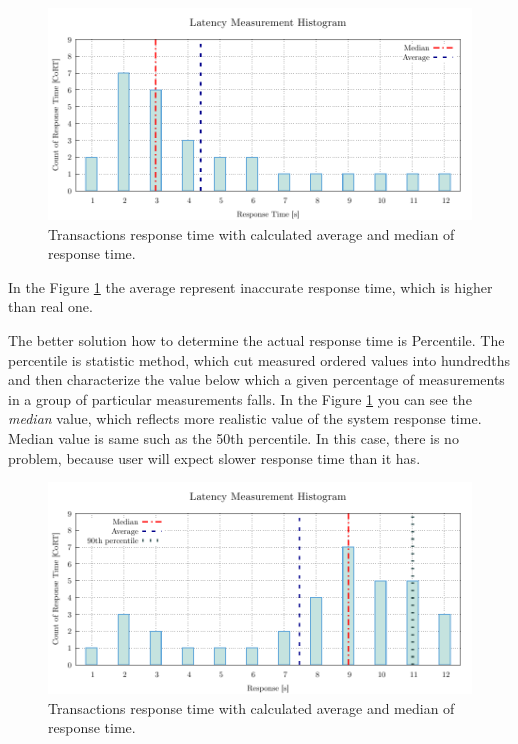 \begin{figure}[H]
  \centering
  \includegraphics[width=15cm]{obrazky-figures/average_median_1.pdf}
  \caption{Transactions response time with calculated average and median of response time.}
  \label{fig:average_percentil_1}
\end{figure}
In the Figure \ref{fig:average_percentil_1} the average represent inaccurate response time, which is higher than real one.

The better solution how to determine the actual response time is Percentile. The percentile is statistic method, which cut measured ordered values into hundredths and then characterize the value below which a given percentage of measurements in a group of particular measurements falls. In the Figure \ref{fig:average_percentil_1} you can see the \emph{median} value, which reflects more realistic value of the system response time. Median value is same such as the 50th percentile. In this case, there is no problem, because user will expect slower response time than it has. 

\begin{figure}[H]
  \centering
  \includegraphics[width=15cm]{obrazky-figures/average_median_2.pdf}
  \caption{Transactions response time with calculated average and median of response time.}
  \label{fig:average_percentil_2}
\end{figure}


